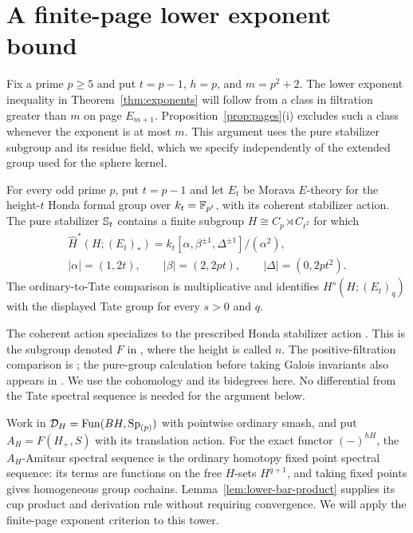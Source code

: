 \section{A finite-page lower exponent bound}\label{sec:exponent-proof}
\label{sec:lower-exponent}
Fix a prime $p\geq5$ and put $t=p-1$, $h=p$, and $m=p^2+2$.
The lower exponent inequality in Theorem~\ref{thm:exponents} will follow
from a class in filtration greater than $m$ on page $E_{m+1}$.
Proposition~\ref{prop:pages}(i) excludes such a class whenever the
exponent is at most $m$. This argument uses the pure stabilizer subgroup
and its residue field, which we specify independently of the extended
group used for the sphere kernel.

\begin{theorem}\label{thm:lower-hm}
For every odd prime $p$, put $t=p-1$ and let $E_t$ be Morava $E$-theory
for the height-$t$ Honda formal group over $k_t=\mathbb F_{p^t}$, with its
coherent stabilizer action. The pure stabilizer $\mathbb S_t$ contains a finite subgroup
$H\cong C_p\rtimes C_{t^2}$ for which
\begin{equation}\label{eq:lower-algebra}
 \begin{gathered}
 \widehat H^*(H;(E_t)_*)
 =k_t[\alpha,\beta^{\pm1},\Delta^{\pm1}]/(\alpha^2),\\
 |\alpha|=(1,2t),\qquad |\beta|=(2,2pt),\qquad
 |\Delta|=(0,2pt^2).
 \end{gathered}
\end{equation}
The ordinary-to-Tate comparison is multiplicative and identifies
$H^s(H;(E_t)_q)$ with the displayed Tate group for every $s>0$ and $q$.
\end{theorem}

The coherent action specializes to the prescribed Honda stabilizer
action \cite[Theorem~1(ii) and Remark~2.4]{dh2004}.
This is the subgroup denoted $F$ in
\cite[Equation~(1.2) and Theorem~4.5]{bbs2020}, where the height is
called $n$. The positive-filtration comparison is
\cite[Remark~2.2]{bbs2020}; the pure-group calculation before taking
Galois invariants also appears in
\cite[proof of Proposition~5.5]{heard2015}.
We use the cohomology and its bidegrees here. No differential from the
Tate spectral sequence is needed for the argument below.

Work in $\mathcal D_H=\operatorname{Fun}(BH,\mathrm{Sp}_{(p)})$ with pointwise ordinary smash,
and put $A_H=F(H_+,S)$ with its translation action. For the exact
functor $(-)^{hH}$, the $A_H$-Amitsur spectral sequence is the ordinary
homotopy fixed point spectral sequence: its terms are functions on the
free $H$-sets $H^{q+1}$, and taking fixed points gives homogeneous group
cochains. Lemma~\ref{lem:lower-bar-product} supplies its cup product and
derivation rule without requiring convergence. We will apply the
finite-page exponent criterion to this tower.

